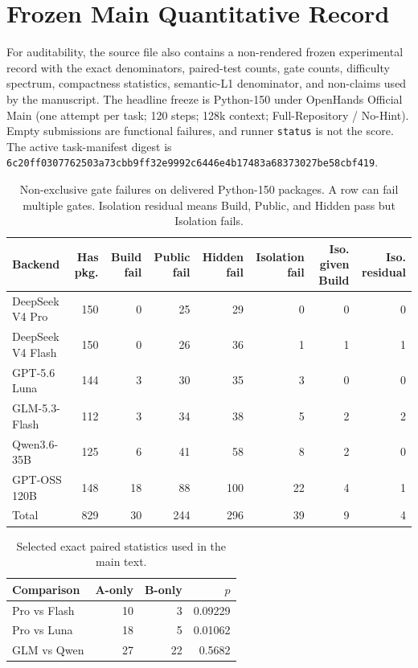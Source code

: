 \documentclass[acmsmall,screen,review,anonymous]{acmart}
\begin{document}
\section{Frozen Main Quantitative Record}
\label{app:frozen-record}

For auditability, the source file also contains a non-rendered frozen experimental
record with the exact denominators, paired-test counts, gate counts, difficulty
spectrum, compactness statistics, semantic-L1 denominator, and non-claims used by
the manuscript. The headline freeze is Python-150 under OpenHands Official Main
(one attempt per task; 120 steps; 128k context; Full-Repository / No-Hint). Empty
submissions are functional failures, and runner \texttt{status} is not the score.
The active task-manifest digest is
\texttt{6c20ff0307762503a73cbb9ff32e9992c6446e4b17483a68373027be58cbf419}.

\begin{table}[t]
  \caption{Non-exclusive gate failures on delivered Python-150 packages. A row can
  fail multiple gates. Isolation residual means Build, Public, and Hidden pass but
  Isolation fails.}
  \label{tab:all-gates}
  \centering
  \begin{tabular}{lrrrrrrr}
    \toprule
    \textbf{Backend} & \textbf{Has pkg.} & \textbf{Build fail} & \textbf{Public fail}
      & \textbf{Hidden fail} & \textbf{Isolation fail} & \textbf{Iso. given Build}
      & \textbf{Iso. residual} \\
    \midrule
    DeepSeek V4 Pro   & 150 & 0  & 25 & 29  & 0  & 0 & 0 \\
    DeepSeek V4 Flash & 150 & 0  & 26 & 36  & 1  & 1 & 1 \\
    GPT-5.6 Luna      & 144 & 3  & 30 & 35  & 3  & 0 & 0 \\
    GLM-5.3-Flash     & 112 & 3  & 34 & 38  & 5  & 2 & 2 \\
    Qwen3.6-35B       & 125 & 6  & 41 & 58  & 8  & 2 & 0 \\
    GPT-OSS 120B      & 148 & 18 & 88 & 100 & 22 & 4 & 1 \\
    \midrule
    Total & 829 & 30 & 244 & 296 & 39 & 9 & 4 \\
    \bottomrule
  \end{tabular}
\end{table}

\begin{table}[t]
  \caption{Selected exact paired statistics used in the main text.}
  \label{tab:frozen-paired}
  \centering
  \begin{tabular}{lrrr}
    \toprule
    \textbf{Comparison} & \textbf{A-only} & \textbf{B-only} & \textbf{$p$} \\
    \midrule
    Pro vs Flash & 10 & 3 & 0.09229 \\
    Pro vs Luna  & 18 & 5 & 0.01062 \\
    GLM vs Qwen  & 27 & 22 & 0.5682 \\
    \bottomrule
  \end{tabular}
\end{table}
\end{document}
